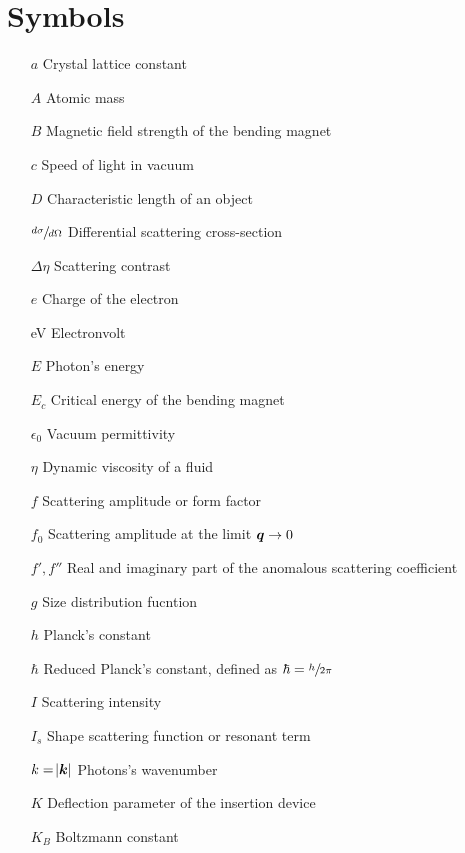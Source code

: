 \section*{Symbols}

\begin{itemize}
        \setlength\itemsep{1pt}
        
        \item[$a$] Crystal lattice constant
        \item[$A$] Atomic mass
        \item[$B$] Magnetic field strength of the bending magnet
        \item[$c$] Speed of light in vacuum     
        \item[$D$] Characteristic length of an object
        \item[$\sfrac{d\sigma}{d\Omega}$] Differential scattering cross-section   
        \item[$\Delta\eta$] Scattering contrast        
        \item[$e$] Charge of the electron  
        \item[eV] Electronvolt
        \item[$E$] Photon's energy
        \item[$E_c$] Critical energy of the bending magnet
        \item[$\epsilon_0$] Vacuum permittivity
        \item[$\eta$] Dynamic viscosity of a fluid 
        \item[$f$] Scattering amplitude or form factor
        \item[$f_0$] Scattering amplitude at the limit $\bm{q}\rightarrow 0$
        \item[$f',f''$] Real and imaginary part of the anomalous scattering coefficient
        \item[$g$] Size distribution fucntion
        \item[$h$] Planck's constant          
        \item[$\hbar$] Reduced Planck's constant, defined as $\hbar = \sfrac{h}{2 \pi}$
        \item[$I$] Scattering intensity
        \item[$I_s$] Shape scattering function or resonant term
        \item[$k=\abs{\bm{k}}$] Photons's wavenumber
        \item[$K$] Deflection parameter of the insertion device
        \item[$K_B$] Boltzmann constant

\end{itemize}

